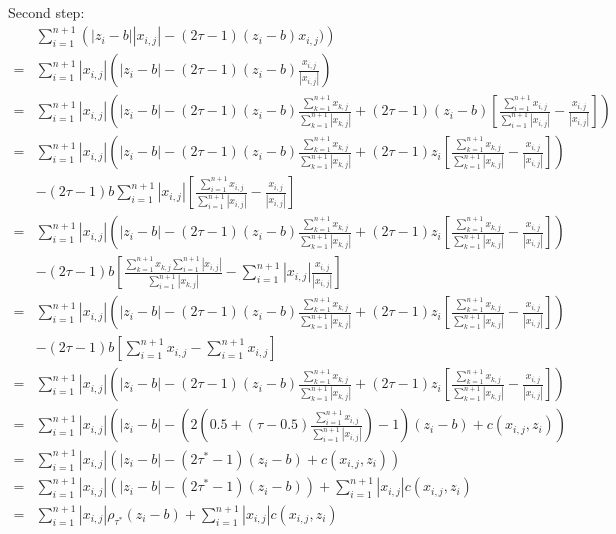 \documentclass[11pt]{article}
\begin{document}
Second step:
\allowdisplaybreaks
\begin{align*}
  & \sum_{i=1}^{n+1}\left( |z_{i}-b| |x_{i,j}| - (2\tau-1)(z_{i}-b)x_{i,j}) \right)& \\
= & \sum_{i=1}^{n+1}|x_{i,j}|\left( |z_{i}-b| - (2\tau-1)(z_{i}-b)\frac{x_{i,j}}{|x_{i,j}|} \right)& \\
= & \sum_{i=1}^{n+1}|x_{i,j}|\left( |z_{i}-b| - (2\tau-1)(z_{i}-b)\frac{\sum_{k=1}^{n+1}x_{k,j}}{\sum_{k=1}^{n+1}|x_{k,j}|}
 + (2\tau-1)(z_{i}-b)\left[ \frac{\sum_{i=1}^{n+1}x_{i,j}}{\sum_{i=1}^{n+1}|x_{i,j}|} - \frac{x_{i,j}}{|x_{i,j}|} \right] \right)& \\
= & \sum_{i=1}^{n+1}|x_{i,j}|\left( |z_{i}-b| - (2\tau-1)(z_{i}-b)\frac{\sum_{k=1}^{n+1}x_{k,j}}{\sum_{k=1}^{n+1}|x_{k,j}|}+(2\tau-1)z_{i}\left[ \frac{\sum_{k=1}^{n+1}x_{k,j}}{\sum_{k=1}^{n+1}|x_{k,j}|} - \frac{x_{i,j}}{|x_{i,j}|} \right]\right) \\
& - (2\tau-1)b\sum_{i=1}^{n+1}|x_{i,j}|\left[ \frac{\sum_{i=1}^{n+1}x_{i,j}}{\sum_{i=1}^{n+1}|x_{i,j}|} - \frac{x_{i,j}}{|x_{i,j}|} \right] & \\
= & \sum_{i=1}^{n+1}|x_{i,j}|\left( |z_{i}-b| - (2\tau-1)(z_{i}-b)\frac{\sum_{k=1}^{n+1}x_{k,j}}{\sum_{k=1}^{n+1}|x_{k,j}|}+(2\tau-1)z_{i}\left[ \frac{\sum_{k=1}^{n+1}x_{k,j}}{\sum_{k=1}^{n+1}|x_{k,j}|} - \frac{x_{i,j}}{|x_{i,j}|} \right]\right) \\
& - (2\tau-1)b\left[\frac{\sum_{k=1}^{n+1}x_{k,j}\sum_{i=1}^{n+1}|x_{i,j}|}{\sum_{i=1}^{n+1}|x_{k,j}|} - \sum_{i=1}^{n+1}|x_{i,j}|\frac{x_{i,j}}{|x_{i,j}|} \right] & \\
= & \sum_{i=1}^{n+1}|x_{i,j}|\left( |z_{i}-b| - (2\tau-1)(z_{i}-b)\frac{\sum_{k=1}^{n+1}x_{k,j}}{\sum_{k=1}^{n+1}|x_{k,j}|}+(2\tau-1)z_{i}\left[ \frac{\sum_{k=1}^{n+1}x_{k,j}}{\sum_{k=1}^{n+1}|x_{k,j}|} - \frac{x_{i,j}}{|x_{i,j}|} \right]\right) \\
& - (2\tau-1)b\left[\sum_{i=1}^{n+1}x_{i,j} - \sum_{i=1}^{n+1}x_{i,j} \right] & \\
= & \sum_{i=1}^{n+1}|x_{i,j}|\left( |z_{i}-b| - (2\tau-1)(z_{i}-b)\frac{\sum_{k=1}^{n+1}x_{k,j}}{\sum_{k=1}^{n+1}|x_{k,j}|}+(2\tau-1)z_{i}\left[ \frac{\sum_{k=1}^{n+1}x_{k,j}}{\sum_{k=1}^{n+1}|x_{k,j}|} - \frac{x_{i,j}}{|x_{i,j}|} \right]\right) \\
= & \sum_{i=1}^{n+1}|x_{i,j}|\left( |z_{i}-b| - (2(0.5+(\tau-0.5)\frac{\sum_{i=1}^{n+1}x_{i,j}}{\sum_{i=1}^{n+1}|x_{i,j}|})-1)(z_{i}-b) + c(x_{i,j}, z_{i}) \right)&\\
= & \sum_{i=1}^{n+1}|x_{i,j}|\left( |z_{i}-b| - (2\tau^{*}-1)(z_{i}-b) + c(x_{i,j}, z_{i}) \right)&\\
= & \sum_{i=1}^{n+1}|x_{i,j}|\left(|z_{i}-b| - (2\tau^{*}-1)(z_{i}-b)\right) + \sum_{i=1}^{n+1}|x_{i,j}|c(x_{i,j}, z_{i})&\\
= & \sum_{i=1}^{n+1}|x_{i,j}|\rho_{\tau^{*}}(z_{i}-b) + \sum_{i=1}^{n+1}|x_{i,j}|c(x_{i,j}, z_{i})&
\end{align*}
\end{document}
